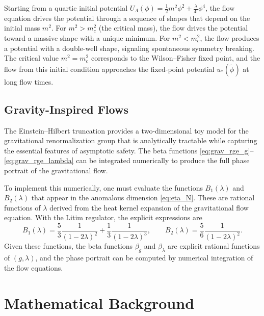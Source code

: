 \documentclass[11pt, twoside, openright]{book}
\theoremstyle{dotted}
\theoremstyle{definition}
\begin{document}
Starting from a quartic initial potential $U_\Lambda(\phi) = \frac{1}{2}m^2\phi^2 +
\frac{\lambda}{4!}\phi^4$, the flow equation drives the potential through a
sequence of shapes that depend on the initial mass $m^2$. For $m^2 > m^2_c$ (the
critical mass), the flow drives the potential toward a massive shape with a unique
minimum. For $m^2 < m^2_c$, the flow produces a potential with a double-well
shape, signaling spontaneous symmetry breaking. The critical value $m^2 = m^2_c$
corresponds to the Wilson--Fisher fixed point, and the flow from this initial
condition approaches the fixed-point potential $u_*(\tilde\phi)$ at long flow times.

\section{Gravity-Inspired Flows}

The Einstein--Hilbert truncation provides a two-dimensional toy model for the
gravitational renormalization group that is analytically tractable while capturing
the essential features of asymptotic safety. The beta functions
\eqref{eq:grav_rge_g}--\eqref{eq:grav_rge_lambda} can be integrated numerically
to produce the full phase portrait of the gravitational flow.

To implement this numerically, one must evaluate the functions $B_1(\lambda)$ and
$B_2(\lambda)$ that appear in the anomalous dimension \eqref{eq:eta_N}. These are
rational functions of $\lambda$ derived from the heat kernel expansion of the
gravitational flow equation. With the Litim regulator, the explicit expressions are
\begin{equation}
  B_1(\lambda) = \frac{5}{3}\frac{1}{(1-2\lambda)^2}
  + \frac{1}{3}\frac{1}{(1-2\lambda)^3},
  \qquad
  B_2(\lambda) = \frac{5}{6}\frac{1}{(1-2\lambda)^2}.
  \label{eq:B_functions}
\end{equation}
Given these functions, the beta functions $\beta_g$ and $\beta_\lambda$ are explicit
rational functions of $(g, \lambda)$, and the phase portrait can be computed by
numerical integration of the flow equations.

\appendix

\chapter{Mathematical Background}
\label{app:math}
\end{document}
